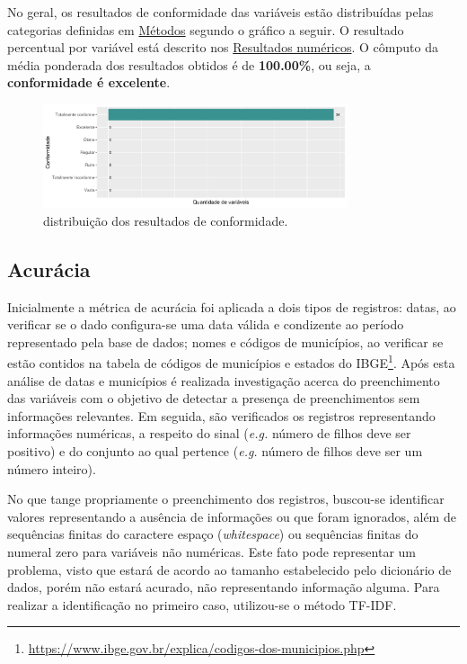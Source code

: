 \documentclass[
  12,
]{proadi}
\begin{document}
No geral, os resultados de conformidade das variáveis estão distribuídas
pelas categorias definidas em \protect\hyperlink{muxe9todos}{Métodos}
segundo o gráfico a seguir. O resultado percentual por variável está
descrito nos \protect\hyperlink{resultados-numuxe9ricos}{Resultados
numéricos}. O cômputo da média ponderada dos resultados obtidos é de
\textbf{100.00\%}, ou seja, a \textbf{conformidade é excelente}.

\begin{figure}
\centering
\includegraphics[width=0.8\textwidth,height=\textheight]{imagens/conf.png}
\caption{distribuição dos resultados de conformidade.}
\end{figure}

\hypertarget{acuruxe1cia}{%
\subsection{Acurácia}\label{acuruxe1cia}}

Inicialmente a métrica de acurácia foi aplicada a dois tipos de
registros: datas, ao verificar se o dado configura-se uma data válida e
condizente ao período representado pela base de dados; nomes e códigos
de municípios, ao verificar se estão contidos na tabela de códigos de
municípios e estados do IBGE\footnote{\url{https://www.ibge.gov.br/explica/codigos-dos-municipios.php}}.
Após esta análise de datas e municípios é realizada investigação acerca
do preenchimento das variáveis com o objetivo de detectar a presença de
preenchimentos sem informações relevantes. Em seguida, são verificados
os registros representando informações numéricas, a respeito do sinal
(\emph{e.g.} número de filhos deve ser positivo) e do conjunto ao qual
pertence (\emph{e.g.} número de filhos deve ser um número inteiro).

No que tange propriamente o preenchimento dos registros, buscou-se
identificar valores representando a ausência de informações ou que foram
ignorados, além de sequências finitas do caractere espaço
(\emph{whitespace}) ou sequências finitas do numeral zero para variáveis
não numéricas. Este fato pode representar um problema, visto que estará
de acordo ao tamanho estabelecido pelo dicionário de dados, porém não
estará acurado, não representando informação alguma. Para realizar a
identificação no primeiro caso, utilizou-se o método TF-IDF.
\end{document}
